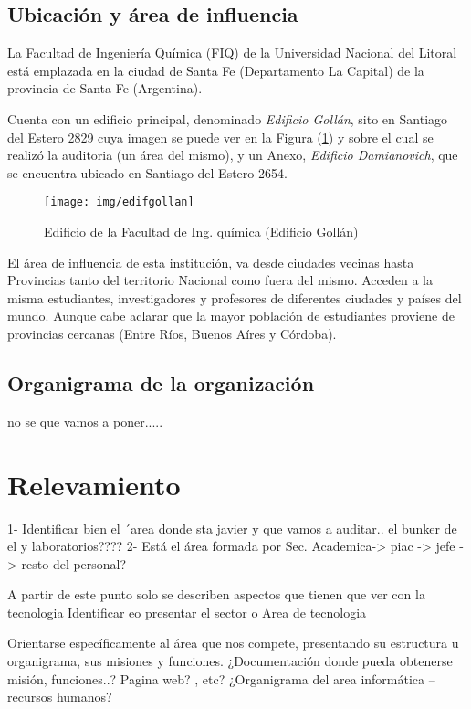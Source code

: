 \documentclass[10pt,a4paper,final]{article}
\begin{document}
\subsection{Ubicación y área de influencia}
La Facultad de Ingeniería Química (FIQ) de la Universidad Nacional del Litoral está emplazada en la ciudad de Santa Fe (Departamento La Capital) de la provincia de Santa Fe (Argentina). 

Cuenta con un edificio principal, denominado \emph{Edificio Gollán}, sito en Santiago del Estero 2829 cuya imagen se puede ver en la Figura (\ref{edif_gollan}) y sobre el cual se realizó la auditoria (un área del mismo), y un Anexo, \emph{Edificio Damianovich}, que se encuentra ubicado en Santiago del Estero 2654.

\begin{figure}[tbhp]
\centerline{\texttt{[image: img/edifgollan]}}
\caption{Edificio de la Facultad de Ing. química (Edificio Gollán)}
\label{edif_gollan}
\end{figure}

El área de influencia de esta institución, va desde ciudades vecinas hasta Provincias tanto del territorio Nacional como fuera del mismo. Acceden a la misma estudiantes, investigadores y profesores de diferentes ciudades y países del mundo. Aunque cabe aclarar que la mayor población de estudiantes proviene de provincias cercanas (Entre Ríos, Buenos Aíres y Córdoba).

\subsection{Organigrama de la organización}
no se que vamos a poner.....
\section{Relevamiento}
1- Identificar bien el ´area donde sta javier y que vamos a auditar.. el bunker de el y laboratorios????
2- Está el área formada por Sec. Academica-> piac -> jefe -> resto del personal?

A partir de este punto solo se describen aspectos que tienen que ver con la tecnologia
Identificar eo presentar el sector o Area de tecnologia

Orientarse específicamente al área que nos compete, presentando su estructura u organigrama, sus misiones y funciones.
¿Documentación donde pueda obtenerse misión, funciones..? Pagina web? , etc?
¿Organigrama del area informática – recursos humanos?
\end{document}

